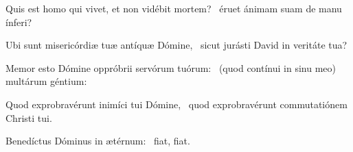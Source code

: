 \item Quis est homo qui vivet, et non vidébit mortem?~\psstar{} éruet ánimam suam de manu ínferi?

\item Ubi sunt misericórdiæ tuæ antíquæ Dómine,~\psstar{} sicut jurásti David in veritáte tua?

\item Memor esto Dómine oppróbrii servórum tuórum:~\psstar{} (quod contínui in sinu meo) multárum géntium:

\item Quod exprobravérunt inimíci tui Dómine,~\psstar{} quod exprobravérunt commutatiónem Christi tui.

\item Benedíctus Dóminus in ætérnum:~\psstar{} fiat, fiat.


